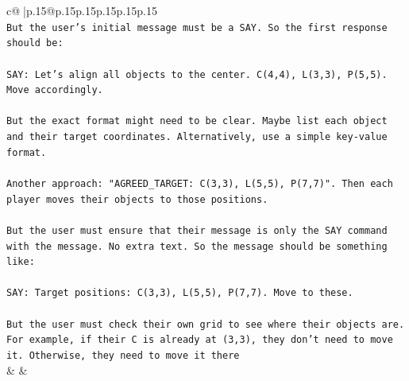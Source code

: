 \documentclass{article}
\begin{document}
{\begin{supertabular}{c@{$\;$}|p{.15\linewidth}@{}p{.15\linewidth}p{.15\linewidth}p{.15\linewidth}p{.15\linewidth}p{.15\linewidth}}
{{{\\ 
\texttt{But the user's initial message must be a SAY. So the first response should be:} \\
\\ 
\texttt{SAY: Let's align all objects to the center. C(4,4), L(3,3), P(5,5). Move accordingly.} \\
\\ 
\texttt{But the exact format might need to be clear. Maybe list each object and their target coordinates. Alternatively, use a simple key{-}value format.} \\
\\ 
\texttt{Another approach: "AGREED\_TARGET: C(3,3), L(5,5), P(7,7)". Then each player moves their objects to those positions.} \\
\\ 
\texttt{But the user must ensure that their message is only the SAY command with the message. No extra text. So the message should be something like:} \\
\\ 
\texttt{SAY: Target positions: C(3,3), L(5,5), P(7,7). Move to these.} \\
\\ 
\texttt{But the user must check their own grid to see where their objects are. For example, if their C is already at (3,3), they don't need to move it. Otherwise, they need to move it there} \\
            }
        }
    }
    & & \\ \\


\end{supertabular}}
\end{document}
